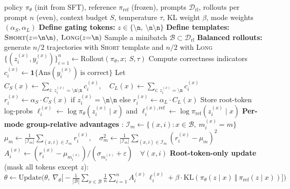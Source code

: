 \begin{algorithm}[t]
\caption{Root-token policy optimization}
\label{alg:root-grpo}
\small
\begin{algorithmic}[1]
\Require policy $\pi_{\theta}$ (init from SFT), reference $\pi_{\text{ref}}$ (frozen), prompts $\mathcal{D}_{\text{rl}}$,
rollouts per prompt $n$ (even), context budget $S$, temperature $\tau$, KL weight $\beta$,
mode weights $(\alpha_S,\alpha_L)$
\State \textbf{Define gating tokens:} $z \in \{\texttt{\textbackslash n},\ \texttt{\textbackslash n\textbackslash n}\}$
\State \textbf{Define templates:} $\textsc{Short}(z{=}\texttt{\textbackslash n\textbackslash n})$, $\textsc{Long}(z{=}\texttt{\textbackslash n})$
  \State Sample a minibatch $\mathcal{B} \subset \mathcal{D}_{\text{rl}}$
    \State \textbf{Balanced rollouts:} generate $n/2$ trajectories with \textsc{Short} template and $n/2$ with \textsc{Long}
    \State $\{(z_i^{(x)}, y_i^{(x)})\}_{i=1}^{n} \gets \mathrm{Rollout}(\pi_{\theta}, x;\ S,\tau)$ 
    \State Compute correctness indicators $c_i^{(x)} \gets \mathbf{1}\{\mathrm{Ans}(y_i^{(x)})\ \text{is correct}\}$
    \State Let $C_S(x) \gets \sum_{i:\,z_i^{(x)}=\texttt{\textbackslash n\textbackslash n}} c_i^{(x)},\quad C_L(x) \gets \sum_{i:\,z_i^{(x)}=\texttt{\textbackslash n}} c_i^{(x)}$
      \State $r_i^{(x)} \gets \alpha_S \cdot C_S(x)$ if $z_i^{(x)}=\texttt{\textbackslash n\textbackslash n}$ else $r_i^{(x)} \gets \alpha_L \cdot C_L(x)$
    \EndFor
    \State Store root-token log-probs $\ell_i^{(x)} \gets \log \pi_{\theta}(z_i^{(x)}\!\mid\! x)$ and $\ell_i^{(x),\text{ref}} \gets \log \pi_{\text{ref}}(z_i^{(x)}\!\mid\! x)$
  \EndFor
  \State \textbf{Per-mode group-relative advantages} :
  \State $\mathcal{I}_m \gets \{(x,i) : x \in \mathcal{B},\ m_i^{(x)} = m\}$ 
  \State $\mu_m \gets \frac{1}{|\mathcal{I}_m|}\!\!\sum_{(x,i) \in \mathcal{I}_m}\!\! r_i^{(x)},\quad
         \sigma_m^2 \gets \frac{1}{|\mathcal{I}_m|}\!\!\sum_{(x,i) \in \mathcal{I}_m}\!\!(r_i^{(x)}-\mu_m)^2$
  \State $A_i^{(x)} \gets (r_i^{(x)} - \mu_{m_i^{(x)}}) / (\sigma_{m_i^{(x)}} + \varepsilon)\quad \forall (x,i)$
  \State \textbf{Root-token-only update} (mask all tokens except $z$):
  \State $\theta \gets \mathrm{Update}\Big(\theta,\ \nabla_{\theta}\big[
    -\frac{1}{|\mathcal{B}|}\sum_{x\in\mathcal{B}}\frac{1}{n}\sum_{i=1}^{n} A_i^{(x)}\,\ell_i^{(x)}
    + \beta\cdot \mathrm{KL}(\pi_{\theta}(z\!\mid\!x)\ \Vert\ \pi_{\text{ref}}(z\!\mid\!x))
  \big]\Big)$
\EndFor
\end{algorithmic}
\end{algorithm}

